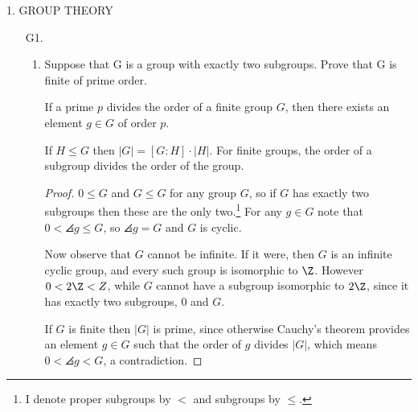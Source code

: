 \documentclass[12pt,letterpaper]{article}
\let\oldphi\phi
\renewcommand{\phi}{\varphi}
\begin{document}
\pagestyle{fancy}

\renewcommand{\B}{\bar{B}(\ell^\infty)}
\newcommand{\Rn}{\R^n}
\renewcommand{\phi}{\oldphi}
\renewcommand{\S}{\script{S}}



\begin{center}
1. GROUP THEORY
\end{center}

\begin{enumerate}
\item[G1.] 
\begin{enumerate}[label=(\alph*)]
\item Suppose that G is a group with exactly two subgroups. Prove that G is finite of prime order.
\begin{theorem*}
If a prime $p$ divides the order of a finite group $G$, then there exists an element $g\in G$ of order $p$. 
\end{theorem*}
\begin{theorem*}
If $H\leq G$ then $|G|=[G:H] \cdot |H|$. For finite groups, the order of a subgroup divides the order of the group. 
\end{theorem*}

\begin{proof}
$0\leq G$ and $G\leq G$ for any group $G$, so if $G$ has exactly two subgroups then these are the only two.\footnote{I denote proper subgroups by $<$ and subgroups by $\leq$.} For any $g\in G$ note that $0<\angles{g}\leq G$, so $\angles{g}= G$ and $G$ is cyclic. 

Now observe that $G$ cannot be infinite. If it were, then $G$ is an infinite cyclic group, and every such group is isomorphic to $\Z$. However $0<2\Z<Z$, while $G$ cannot have a subgroup isomorphic to $2\Z$, since it has exactly two subgroups, $0$ and $G$.  

If $G$ is finite then $|G|$ is prime, since otherwise Cauchy's theorem provides an element $g\in G$ such that the order of $g$ divides $|G|$, which means $0<\angles{g}< G$, a contradiction. 
\end{proof}



\end{enumerate}
\end{enumerate}
\end{document}
